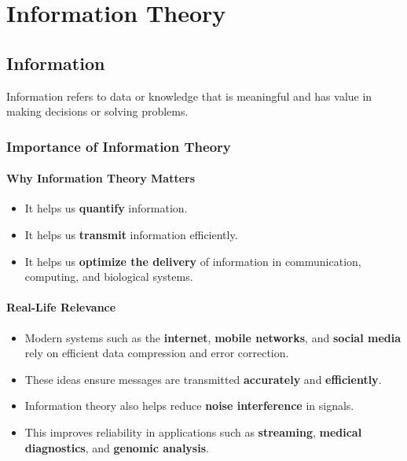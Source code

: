 \documentclass[11pt,a4paper]{book}
\newenvironment{definitionbox}[1][Definition]{%
    \begin{tcolorbox}[
        enhanced,
        breakable,
        colback=primaryblue!10,
        colframe=primaryblue!150,
        title=#1,
        fonttitle=\bfseries,
        sharp corners,
        boxrule=0.8pt,
        left=8pt,
        right=8pt,
        top=6pt,
        bottom=6pt
    ]
}{\end{tcolorbox}}
\begin{document}
\setcounter{page}{1}
\tableofcontents
\clearpage

\chapter{Information Theory}

\section{Information}

\begin{definitionbox}[Information]
Information refers to data or knowledge that is meaningful and has value in making decisions or solving problems.
\end{definitionbox}

\subsection{Importance of Information Theory}

\subsubsection{Why Information Theory Matters}
\begin{itemize}
    \item It helps us \textbf{quantify} information.
    \item It helps us \textbf{transmit} information efficiently.
    \item It helps us \textbf{optimize the delivery} of information in communication, computing, and biological systems.
\end{itemize}

\subsubsection{Real-Life Relevance}
\begin{itemize}
    \item Modern systems such as the \textbf{internet}, \textbf{mobile networks}, and \textbf{social media} rely on efficient data compression and error correction.
    \item These ideas ensure messages are transmitted \textbf{accurately} and \textbf{efficiently}.
    \item Information theory also helps reduce \textbf{noise interference} in signals.
    \item This improves reliability in applications such as \textbf{streaming}, \textbf{medical diagnostics}, and \textbf{genomic analysis}.
\end{itemize}
\end{document}
